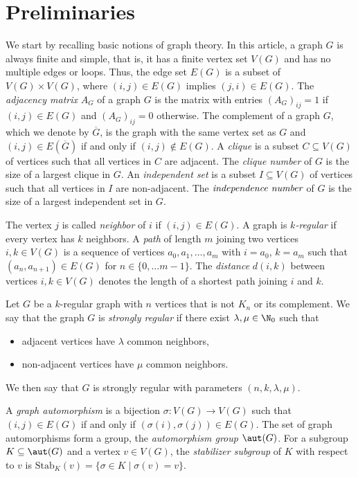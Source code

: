\section{Preliminaries}\label{secprelim}
We start by recalling basic notions of graph theory. In this article, a graph $G$ is always finite and simple, that is, it has a finite vertex set $V(G)$ and has no multiple edges or loops. Thus, the edge set $E(G)$ is a subset of $V(G)\times V(G)$, where $(i,j)\in E(G)$ implies $(j,i)\in E(G)$. The \emph{adjacency matrix} $A_G$ of a graph $G$ is the matrix with entries $(A_G)_{ij}=1$ if $(i,j)\in E(G)$ and $(A_G)_{ij}=0$ otherwise. The complement of a graph $G$, which we denote by $\overline{G}$, is the graph with the same vertex set as $G$ and $(i,j)\in E(\overline{G})$ if and only if $(i,j)\notin E(G)$. 
A \emph{clique} is a subset $C\subseteq V(G)$ of vertices such that all vertices in $C$ are adjacent. The \emph{clique number} of $G$ is the size of a largest clique in $G$. An \emph{independent set} is a subset $I\subseteq V(G)$ of vertices such that all vertices in $I$ are non-adjacent. The $\emph{independence number}$ of $G$ is the size of a largest independent set in $G$.

The vertex $j$ is called \emph{neighbor} of $i$ if $(i,j)\in E(G)$. A graph is \emph{$k$-regular} if every vertex has $k$ neighbors. A \emph{path} of length $m$ joining two vertices $i,k \in V(G)$ is a sequence of vertices $a_0, a_1, \dots, a_m$ with $i=a_0$, $k=a_m$ such that $(a_n,a_{n+1})\in E(G)$ for $n\in \{0, \dots m-1\}$. The \emph{distance} $d(i,k)$ between vertices $i,k\in V(G)$ denotes the length of a shortest path joining $i$ and $k$. 

\begin{defi}
Let $G$ be a $k$-regular graph with $n$ vertices that is not $K_n$ or its complement. We say that the graph $G$ is \emph{strongly regular} if there exist $\lambda, \mu\in \N_0$ such that
\begin{itemize}
    \item[(i)] adjacent vertices have $\lambda$ common neighbors,
    \item[(ii)] non-adjacent vertices have $\mu$ common neighbors. 
\end{itemize}
We then say that $G$ is strongly regular with parameters $(n, k, \lambda, \mu)$.
\end{defi}

A \emph{graph automorphism} is a bijection $\sigma:V(G)\to V(G)$ such that $(i,j)\in E(G)$ if and only if $(\sigma(i), \sigma(j))\in E(G)$. The set of graph automorphisms form a group, the \emph{automorphism group} $\aut(G)$. For a subgroup $K\subseteq \aut(G)$ and a vertex $v\in V(G)$, the \emph{stabilizer subgroup} of $K$ with respect to $v$ is $\mathrm{Stab}_K(v)=\{\sigma \in K \mid \sigma(v)=v\}$.

